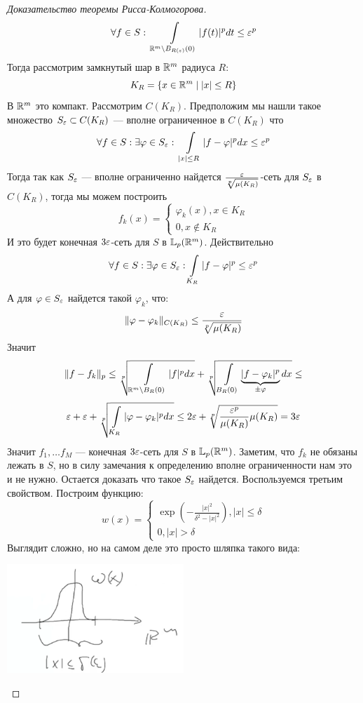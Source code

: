 \begin{proof}[Доказательство теоремы Рисса-Колмогорова]
	$$
	\forall f \in S: \ \int\limits_{\mathbb{R}^m \setminus B_{R(\varepsilon)}(0)} |f(t)|^pdt \leq \varepsilon^p
	$$
	Тогда рассмотрим замкнутый шар в $\mathbb{R}^m$ радиуса $R$:
	$$
	K_R = \{x \in \mathbb{R}^m \mid |x| \leq R\}
	$$
	В $\mathbb{R}^m$ это компакт. Рассмотрим $C(K_R)$. Предположим мы нашли такое множество $S_\varepsilon \subset C(K_R)$ --- вполне ограниченное в $C(K_R)$  что
	$$
	\forall f \in S: \exists \varphi \in S_\varepsilon: \ \int\limits_{|x| \leq R} |f - \varphi|^p dx \leq \varepsilon^p
	$$
	Тогда так как $S_\varepsilon$ --- вполне ограниченно найдется $\frac{\varepsilon}{\sqrt[p]{\mu (K_R)}}$-сеть для $S_\varepsilon$ в $C(K_R)$, тогда мы можем построить 
	$$
	f_k(x) = \begin{cases}
		\varphi_k(x), x \in K_R \\
		0, x \notin K_R
	\end{cases}
	$$
	И это будет конечная $3\varepsilon$-сеть для $S$ в $\mathbb{L}_p(\mathbb{R}^m)$. Действительно 
	$$
	\forall f \in S: \exists \varphi \in S_\varepsilon : \int\limits_{K_R}|f-\varphi|^p \leq \varepsilon^p
	$$
	А для $\varphi \in S_\varepsilon$ найдется такой $\varphi_k$, что:
	$$
	\|\varphi - \varphi_k\|_{C(K_R)} \leq \frac{\varepsilon}{\sqrt[p]{\mu(K_R)}}
	$$
	Значит
	$$
	\|f - f_k\|_p \leq \sqrt[p]{\int\limits_{\mathbb{R}^m \setminus B_{R}(0)} |f|^p dx} + \sqrt[p]{\int\limits_{B_{R}(0)}\underbrace{|f - \varphi_k|^p}_{\pm \varphi}dx} \leq 
	$$
	$$
	\varepsilon + \varepsilon + \sqrt[p]{\int\limits_{K_R} |\varphi - \varphi_k|^p dx} \leq 2\varepsilon + \sqrt[p]{\frac{\varepsilon^p}{\mu(K_R)}\mu(K_R)} = 3\varepsilon
	$$
	Значит $f_1, \dots f_M$ --- конечная $3\varepsilon$-сеть для $S$ в $\mathbb{L}_p(\mathbb{R}^m)$. Заметим, что $f_k$ не обязаны лежать в $S$, но в силу замечания к определению вполне ограниченности нам это и не нужно.
	Остается доказать что такое $S_\varepsilon$ найдется. Воспользуемся третьим свойством.  
	Построим функцию: 
	$$
	w (x) = \begin{cases}
		\exp \left( - \frac{|x|^2}{\delta^2 - |x|^2}\right), |x| \leq \delta \\
		0, |x| > \delta
	\end{cases}
	$$	
	Выглядит сложно, но на самом деле это просто шляпка такого вида:
	\begin{center}
		\includegraphics[width=0.5\textwidth]{pic/omega}

\end{center}
\end{proof}
